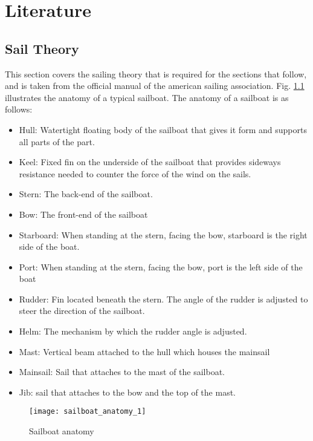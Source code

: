 \graphicspath{{literature/fig/}}

\chapter{Literature}

\section{Sail Theory}
This section covers the sailing theory that is required for the sections that follow, and is taken from the official manual of the american sailing 
association\cite{ASA}. Fig. \ref{fig:sailboat_anatomy} illustrates the anatomy of a typical sailboat. The anatomy of a sailboat is as follows:

\begin{itemize}
    \item Hull: Watertight floating body of the sailboat that gives it form and supports all parts of the part.
    \item Keel: Fixed fin on the underside of the sailboat that provides sideways resistance needed to counter the force of the wind on the sails.
    \item Stern: The back-end of the sailboat.
    \item Bow: The front-end of the sailboat
    \item Starboard: When standing at the stern, facing the bow, starboard is the right side of the boat.
    \item Port: When standing at the stern, facing the bow, port is the left side of the boat 
    \item Rudder: Fin located beneath the stern. The angle of the rudder is adjusted to steer the direction of the sailboat.
    \item Helm: The mechanism by which the rudder angle is adjusted.
    \item Mast: Vertical beam attached to the hull which houses the mainsail
    \item Mainsail: Sail that attaches to the mast of the sailboat.
    \item Jib: sail that attaches to the bow and the top of the mast.
\end{itemize}

\begin{figure}[!h]
    \centering
    \texttt{[image: sailboat\_anatomy\_1]}
    \caption[Sailboat anatomy]{Sailboat anatomy \cite{sail_anatomy}}
    \label{fig:sailboat_anatomy}
\end{figure}

